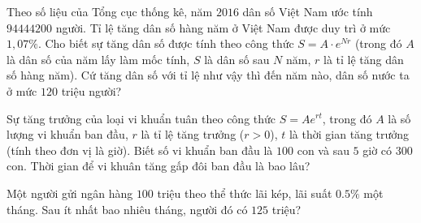 \begin{bt}%
Theo số liệu của Tổng cục thống kê, năm $2016$ dân số Việt Nam ước tính $94444200$ người. Tỉ lệ tăng dân số hàng năm ở Việt Nam được duy trì ở mức $1{,}07\%$. Cho biết sự tăng dân số được tính theo công thức $S=A\cdot e^{Nr}$ (trong đó $A$ là dân số của năm lấy làm mốc tính, $S$ là dân số sau $N$ năm, $r$ là tỉ lệ tăng dân số hàng năm). Cứ tăng dân số với tỉ lệ như vậy thì đến năm nào, dân số nước ta ở mức $120$ triệu người?
\end{bt}

\begin{bt}%
Sự tăng trưởng của loại vi khuẩn tuân theo công thức $S=A e^{rt}$, trong đó $A$ là số lượng vi khuẩn ban đầu, $r$ là tỉ lệ tăng trưởng ($r>0$), $t$ là thời gian tăng trưởng (tính theo đơn vị là giờ). Biết số vi khuẩn ban đầu là $100$ con và sau $5$ giờ có $300$ con. Thời gian để vi khuân tăng gấp đôi ban đầu là bao lâu?
\end{bt}

\begin{bt}%
Một người gửi ngân hàng $100$ triệu theo thể thức lãi kép, lãi suất $0.5\%$ một tháng. Sau ít nhất bao nhiêu tháng, người đó có $125$ triệu?
\end{bt}

